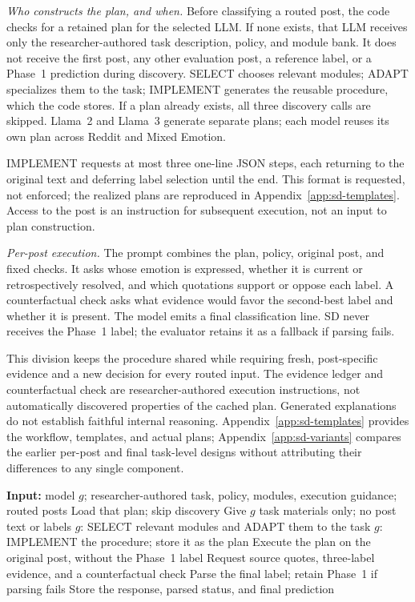 \documentclass{ieeeaccess}
\begin{document}
\textit{Who constructs the plan, and when.} Before classifying a routed post, the code checks for a retained plan for the selected LLM. If none exists, that LLM receives only the researcher-authored task description, policy, and module bank. It does not receive the first post, any other evaluation post, a reference label, or a Phase~1 prediction during discovery. SELECT chooses relevant modules; ADAPT specializes them to the task; IMPLEMENT generates the reusable procedure, which the code stores. If a plan already exists, all three discovery calls are skipped. Llama~2 and Llama~3 generate separate plans; each model reuses its own plan across Reddit and Mixed Emotion.

IMPLEMENT requests at most three one-line JSON steps, each returning to the original text and deferring label selection until the end. This format is requested, not enforced; the realized plans are reproduced in Appendix~\ref{app:sd-templates}. Access to the post is an instruction for subsequent execution, not an input to plan construction.

\textit{Per-post execution.} The prompt combines the plan, policy, original post, and fixed checks. It asks whose emotion is expressed, whether it is current or retrospectively resolved, and which quotations support or oppose each label. A counterfactual check asks what evidence would favor the second-best label and whether it is present. The model emits a final classification line. SD never receives the Phase~1 label; the evaluator retains it as a fallback if parsing fails.

This division keeps the procedure shared while requiring fresh, post-specific evidence and a new decision for every routed input. The evidence ledger and counterfactual check are researcher-authored execution instructions, not automatically discovered properties of the cached plan. Generated explanations do not establish faithful internal reasoning. Appendix~\ref{app:sd-templates} provides the workflow, templates, and actual plans; Appendix~\ref{app:sd-variants} compares the earlier per-post and final task-level designs without attributing their differences to any single component.

\begin{algorithm}[t]
\caption{Final task-level SELF-DISCOVER re-evaluation}
\label{alg:sd-final}\footnotesize
\begin{algorithmic}[1]
\State \textbf{Input:} model $g$; researcher-authored task, policy, modules, execution guidance; routed posts
\State Load that plan; skip discovery
\Else
\State Give $g$ task materials only; no post text or labels
\State $g$: SELECT relevant modules and ADAPT them to the task
\State $g$: IMPLEMENT the procedure; store it as the plan
\EndIf
{}
\State Execute the plan on the original post, without the Phase~1 label
\State Request source quotes, three-label evidence, and a counterfactual check
\State Parse the final label; retain Phase~1 if parsing fails
\State Store the response, parsed status, and final prediction
\EndFor
\end{algorithmic}\end{algorithm}
\end{document}
